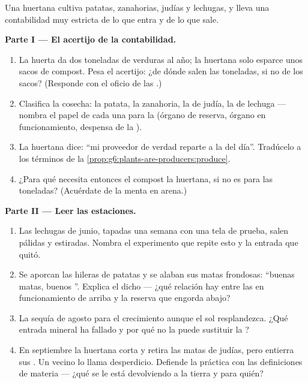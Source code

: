 \begin{problem}\label{pb:g6:plants-are-producers:1}
Una huertana cultiva patatas, zanahorias, judías y lechugas, y lleva
una contabilidad muy estricta de lo que entra y de lo que sale.

\medskip\noindent\textbf{Parte I --- El acertijo de la contabilidad.}
\begin{enumerate}
  \item La huerta da dos toneladas de verduras al año; la huertana solo
        esparce unos sacos de compost. Pesa el acertijo: ¿de dónde
        salen las toneladas, si no de los sacos? (Responde con el
        oficio de las .)
  \item Clasifica la cosecha: la patata, la zanahoria, la  de
        judía, la  de lechuga --- nombra el papel de cada una para
        la  (órgano de reserva, órgano en funcionamiento,
        despensa de la ).
  \item La huertana dice: ``mi proveedor de verdad reparte a la  del
        día''. Tradúcelo a los términos de la
        \cref{prop:g6:plants-are-producers:produce}.
  \item ¿Para qué necesita entonces el compost la huertana, si no es
        para las toneladas? (Acuérdate de la menta en arena.)
\end{enumerate}

\medskip\noindent\textbf{Parte II --- Leer las estaciones.}
\begin{enumerate}[resume]
  \item Las lechugas de junio, tapadas una semana con una tela de
        prueba, salen pálidas y estiradas. Nombra el experimento que
        repite esto y la entrada que quitó.
  \item Se aporcan las hileras de patatas y se alaban sus matas
        frondosas: ``buenas matas, buenos ''. Explica el
        dicho --- ¿qué relación hay entre las  en funcionamiento
        de arriba y la reserva que engorda abajo?
  \item La sequía de agosto para el crecimiento aunque el sol
        resplandezca. ¿Qué entrada mineral ha fallado y por qué no la
        puede sustituir la ?
  \item En septiembre la huertana corta y retira las matas de judías,
        pero entierra sus . Un vecino lo llama desperdicio.
        Defiende la práctica con las definiciones de materia --- ¿qué
        se le está devolviendo a la tierra y para quién?
\end{enumerate}


\end{problem}
